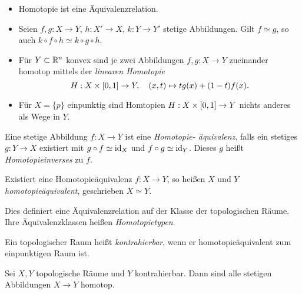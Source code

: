 \documentclass{cheat-sheet}
\begin{document}
\begin{prop}
  \begin{itemize}
    \item Homotopie ist eine Äquivalenzrelation.
    \item Seien $f, g : X \to Y$, $h : X' \to X$, $k : Y \to Y'$ stetige Abbildungen. Gilt $f \simeq g$, so auch $k \circ f \circ h \simeq k \circ g \circ h$.
  \end{itemize}
\end{prop}

\begin{bsp}
  \begin{itemize}
    \item Für $Y \subset \mathbb{R}^n$ konvex sind je zwei Abbildungen $f, g : X \to Y$ zueinander homotop mittels der \emph{linearen Homotopie}
    \[ H : X \times \left[ 0, 1 \right] \to Y, \quad (x, t) \mapsto t g(x) + (1-t) f(x). \]
    \item Für $X = \{ p \}$ einpunktig sind Homtopien $H : X \times \left[ 0, 1 \right] \to Y$ nichts anderes als Wege in $Y$. %
  \end{itemize}
\end{bsp}

\begin{defn}
  Eine stetige Abbildung $f : X \to Y$ ist eine \emph{Homotopie- äquivalenz}, falls ein stetiges $g : Y \to X$ existiert mit $g \circ f \simeq \mathrm{id}_X$ und $f \circ g \simeq \mathrm{id}_Y$. Dieses $g$ heißt \emph{Homotopieinverses} zu $f$.
\end{defn}

\begin{defn}
  Existiert eine Homotopieäquivalenz $f : X \to Y$, so heißen $X$ und $Y$ \emph{homotopieäquivalent}, geschrieben $X \simeq Y$.
\end{defn}

\begin{bem}
  Dies definiert eine Äquivalenzrelation auf der Klasse der topologischen Räume. Ihre Äquivalenzklassen heißen \emph{Homotopietypen}.
\end{bem}

\begin{defn}
  Ein topologischer Raum heißt \emph{kontrahierbar}, wenn er homotopieäquivalent zum einpunktigen Raum ist.
\end{defn}

\begin{lem}
  Sei $X, Y$ topologische Räume und $Y$ kontrahierbar. Dann sind alle stetigen Abbildungen $X \to Y$ homotop.
\end{lem}
\end{document}

